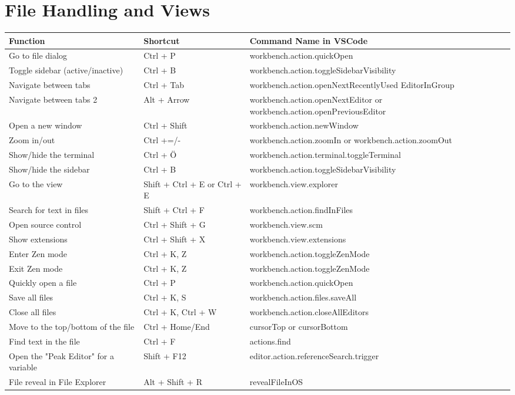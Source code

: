 \documentclass{article}
\begin{document}
\section*{File Handling and Views}
\begin{longtable}{|p{6cm}|p{3cm}|p{7cm}|}
\hline
\rowcolor{white}
\textbf{Function} & \textbf{Shortcut} & \textbf{Command Name in VSCode} \\
\hline
Go to file dialog & Ctrl + P & workbench.action.quickOpen \\
Toggle sidebar (active/inactive) & Ctrl + B & workbench.action.toggleSidebarVisibility \\
Navigate between tabs & Ctrl + Tab & workbench.action.openNextRecentlyUsed EditorInGroup \\
Navigate between tabs 2 & Alt + Arrow & workbench.action.openNextEditor or workbench.action.openPreviousEditor \\
Open a new window & Ctrl + Shift & workbench.action.newWindow \\
Zoom in/out & Ctrl +=/- & workbench.action.zoomIn or workbench.action.zoomOut \\
Show/hide the terminal & Ctrl + Ö & workbench.action.terminal.toggleTerminal \\
Show/hide the sidebar & Ctrl + B & workbench.action.toggleSidebarVisibility \\
Go to the view & Shift + Ctrl + E or Ctrl + E & workbench.view.explorer \\
Search for text in files & Shift + Ctrl + F & workbench.action.findInFiles \\
Open source control & Ctrl + Shift + G & workbench.view.scm \\
Show extensions & Ctrl + Shift + X & workbench.view.extensions \\
Enter Zen mode & Ctrl + K, Z & workbench.action.toggleZenMode \\
Exit Zen mode & Ctrl + K, Z & workbench.action.toggleZenMode \\
Quickly open a file & Ctrl + P & workbench.action.quickOpen \\
Save all files & Ctrl + K, S & workbench.action.files.saveAll \\
Close all files & Ctrl + K, Ctrl + W & workbench.action.closeAllEditors \\
Move to the top/bottom of the file & Ctrl + Home/End & cursorTop or cursorBottom \\
Find text in the file & Ctrl + F & actions.find \\
Open the "Peak Editor" for a variable & Shift + F12 & editor.action.referenceSearch.trigger \\
File reveal in File Explorer & Alt + Shift + R & revealFileInOS \\
\hline
\end{longtable}
\end{document}
